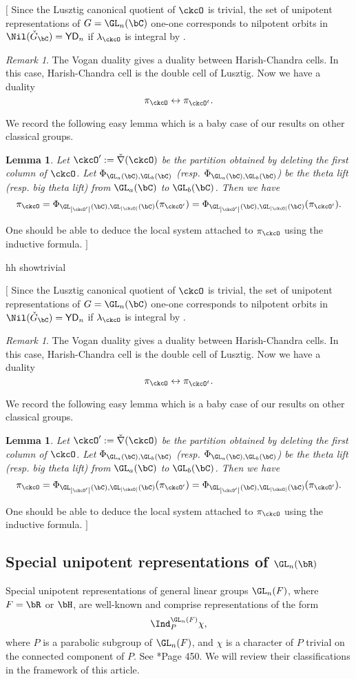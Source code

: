 \documentclass[12pt,a4paper]{amsart}
\newcommand{\trivial}[2][]{\if\relax\detokenize{#1}\relax
  {%
      \color{orange} \vspace{0em} $[$  #2 $]$
      \color{black}
  }
  \else
\ifx#1h
\ifcsname showtrivial\endcsname
{%
    \color{orange} \vspace{0em}  $[$ #2 $]$
    \color{black}
}
\fi
\else {\red Wrong argument!} \fi
\fi
}
\def\abs#1{\left|{#1}\right|}
\def\DDD{{\check\nabla}}
\numberwithin{equation}{section}
\newtheorem{lem}[thm]{Lemma}
\theoremstyle{remark}
\newtheorem{remark}[thm]{Remark}
\def\half{{\tfrac{1}{2}}}
\def\ckGc{\check{G}_{\bC}}
\def\YD{\mathsf{YD}}
\def\lamck{\lambda_\ckcO}
\begin{document}


\trivial[h]{
Since the Lusztig canonical quotient of $\ckcO$ is trivial, the set of unipotent representations
of $G = \GL_n(\bC)$ one-one corresponds to nilpotent orbits in
$\Nil(\ckGc) = \YD_{n}$ if $\lamck$ is integral by
\cite{BVUni}.


\begin{remark}
The Vogan duality gives a duality between Harish-Chandra cells.
In this case, Harish-Chandra cell is the double cell
of Lusztig.
Now we have a duality
\[
 \pi_\ckcO \leftrightarrow \pi_{\ckcO^t}.
\]
\end{remark}

We record the following easy lemma which is a baby case of our results on other
classical groups.
\begin{lem}
  Let $\ckcO' := \DDD(\ckcO)$ be the partition obtained by deleting the first
  column of $\ckcO$. Let $\Phi_{\GL_{a}(\bC),\GL_{b}(\bC)}$ (resp.
  $\Phi_{\GL_{a}(\bC),\GL_{b}(\bC)}$) be the theta lift (resp. big theta lift)
  from $\GL_a(\bC)$ to $\GL_b(\bC)$. Then we have
  \[
    \pi_{\ckcO} = \Phi_{\GL_{\abs{\ckcO'}}(\bC),\GL_{\abs{\ckcO}}(\bC)} (\pi_{\ckcO'})= \Phi_{\GL_{\abs{\ckcO'}}(\bC),\GL_{\abs{\ckcO}}(\bC)} (\pi_{\ckcO'}).
  \]
\end{lem}

One should be able to deduce the local system attached to $\pi_{\ckcO}$ using
the inductive formula.
}

\subsection{Special unipotent representations of $\GL_n(\bR)$}



Special unipotent representations of general linear groups $\GL_{n}(F)$, where $F= \bR$ or $\bH$, are well-known and comprise
representations of the form
\[
  \Ind_{P}^{\GL_{n}(F)}\chi,
\]
where $P$ is a parabolic subgroup of $\GL_{n}(F)$,
and $\chi$ is a character of $P$ trivial on the connected component of $P$. See \cite{V.GL}*{Page 450}. We will review their classifications in the framework of this article.


\end{document}
